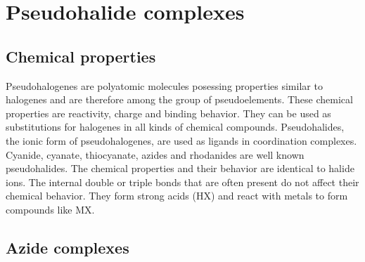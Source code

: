 \chapter{Pseudohalide complexes}
\section{Chemical properties}
Pseudohalogenes are polyatomic molecules posessing properties similar to halogenes and are therefore among the group of pseudoelements. These chemical properties are reactivity, charge and binding behavior. They can be used as substitutions for halogenes in all kinds of chemical  compounds. Pseudohalides, the ionic form of pseudohalogenes, are used as ligands in coordination complexes. Cyanide, cyanate, thiocyanate, azides and rhodanides are well known pseudohalides. The chemical properties and their behavior are identical to halide ions. The internal double or triple bonds that are often present do not affect their chemical behavior. They form strong acids (HX) and  react with metals to form compounds like MX. \cite{holub}


\section{Azide complexes}

